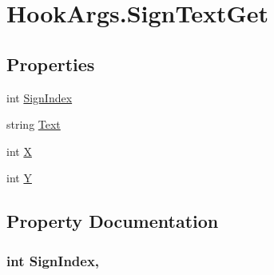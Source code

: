 \hypertarget{structOTA_1_1Plugin_1_1HookArgs_1_1SignTextGet}{}\section{Hook\+Args.\+Sign\+Text\+Get}
\label{structOTA_1_1Plugin_1_1HookArgs_1_1SignTextGet}
\subsection*{Properties}
\begin{DoxyCompactItemize}
\item 
int \hyperlink{structOTA_1_1Plugin_1_1HookArgs_1_1SignTextGet_a531652b61ae2a8227c47b07f0ac33804}{Sign\+Index}
\item 
string \hyperlink{structOTA_1_1Plugin_1_1HookArgs_1_1SignTextGet_ab4726c7c06ae41233e679361293b4173}{Text}
\item 
int \hyperlink{structOTA_1_1Plugin_1_1HookArgs_1_1SignTextGet_a80c0944640e62d3ed6c5419c1bcc0c88}{X}
\item 
int \hyperlink{structOTA_1_1Plugin_1_1HookArgs_1_1SignTextGet_aa482c4cc86a24474e4fb19b5b5978778}{Y}
\end{DoxyCompactItemize}


\subsection{Property Documentation}
\hypertarget{structOTA_1_1Plugin_1_1HookArgs_1_1SignTextGet_a531652b61ae2a8227c47b07f0ac33804}{}
\subsubsection[{Sign\+Index}]{\setlength{\rightskip}{0pt plus 5cm}int Sign\+Index\hspace{0.3cm}{\ttfamily [get]}, {\ttfamily [set]}}\label{structOTA_1_1Plugin_1_1HookArgs_1_1SignTextGet_a531652b61ae2a8227c47b07f0ac33804}
\hypertarget{structOTA_1_1Plugin_1_1HookArgs_1_1SignTextGet_ab4726c7c06ae41233e679361293b4173}{}
